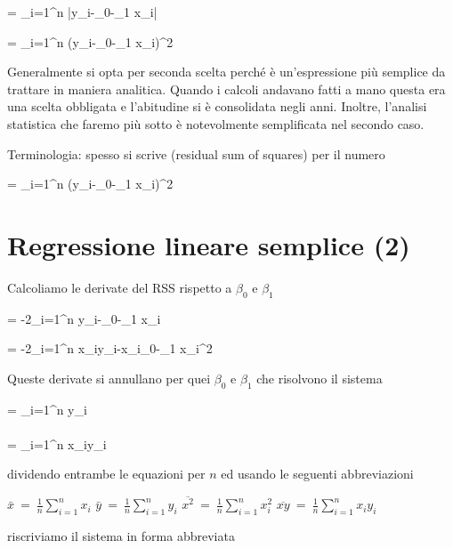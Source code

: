 \documentclass[11pt,openany]{book}
\def\emph#1{\textcolor{blue}{\textbf{\boldmath #1}}}
\renewcommand*{\emph}[1]{%
   \smash{\tikz[baseline]\node[rectangle, fill=teal!25, rounded corners, inner xsep=0.5ex, inner ysep=0.2ex, anchor=base, minimum height = 2.7ex]{#1};}}
\begin{document}
{=}
{\sum_{i=1}^n |y_i-\beta_0-\beta_1 x_i|}

{=}
{\sum_{i=1}^n (y_i-\beta_0-\beta_1 x_i)^2}

Generalmente si opta per seconda scelta perché è un'espressione più semplice da trattare in maniera analitica. Quando i calcoli andavano fatti a mano questa era una scelta obbligata e l'abitudine si è consolidata negli anni. Inoltre, l'analisi statistica che faremo più sotto è notevolmente semplificata nel secondo caso.


Terminologia: spesso si scrive \emph{RSS\/} (residual sum of squares) per il numero

{=}
{\sum_{i=1}^n (y_i-\beta_0-\beta_1 x_i)^2}
 
\clearpage\section{Regressione lineare semplice (2)}
\label{regressione_lineare2}

Calcoliamo le derivate del RSS rispetto a $\beta_0$ e $\beta_1$

{=}
{-2\sum_{i=1}^n y_i-\beta_0-\beta_1 x_i}

{=}
{-2\sum_{i=1}^n x_iy_i-x_i\beta_0-\beta_1 x_i^2}


Queste derivate si annullano per quei $\beta_0$ e $\beta_1$ che risolvono il sistema

{=}
{\sum_{i=1}^n y_i}
\\
\\
{=}
{\sum_{i=1}^n x_iy_i}

dividendo entrambe le equazioni per $n$ ed usando le seguenti abbreviazioni

$\displaystyle\bar x\ =\ \frac1n\sum_{i=1}^n x_i$
\hfill
$\displaystyle\bar y\ =\ \frac1n\sum_{i=1}^n y_i$
\hfill
$\displaystyle\overline{x^2}\ =\ \frac1n\sum_{i=1}^n x_i^2$
\hfill
$\displaystyle\overline{xy}\ =\ \frac1n\sum_{i=1}^n x_iy_i$

riscriviamo il sistema in forma abbreviata
\end{document}
